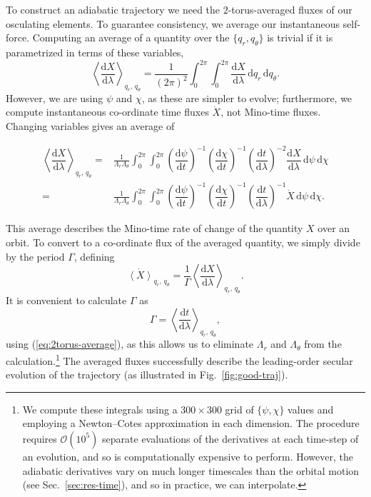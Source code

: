 \documentclass[aps,prd,amsfonts,amssymb,amsmath,nofootinbib,showpacs,superscriptaddress,twocolumn]{revtex4}
\newcommand{\eqnref}[1]{(\ref{eq:#1})}
\newcommand{\figref}[1]{Fig.~\ref{fig:#1}}
\newcommand{\secref}[1]{Sec.~\ref{sec:#1}}
\newcommand{\dd}{\ensuremath{\mathrm{d}}}
\newcommand{\diff}[2]{\ensuremath{\dfrac{\dd {#1}}{\dd {#2}}}}
\newcommand{\intd}[4]{\ensuremath{\int_{#1}^{#2}{#3}\,\dd{#4}}}
\begin{document}
To construct an adiabatic trajectory we need the $2$-torus-averaged fluxes of our osculating elements. To guarantee consistency, we average our instantaneous self-force. Computing an average of a quantity over the $\{q_r, q_\theta\}$ is trivial if it is parametrized in terms of these variables,
\begin{equation}
\left\langle \diff{X}{\lambda}\right\rangle_{q_r,\,q_\theta} = \frac{1}{(2\pi)^2}\intd{0}{2\pi}{\intd{0}{2\pi}{\diff{X}{\lambda}}{q_r}}{q_\theta}.
\end{equation}
However, we are using $\psi$ and $\chi$, as these are simpler to evolve; furthermore, we compute instantaneous co-ordinate time fluxes $\dot{X}$, not Mino-time fluxes. Changing variables gives an average of \cite{Drasco2005}
\begin{widetext}\begin{align}
\left\langle \diff{X}{\lambda}\right\rangle_{q_r,\,q_\theta} = {} & \frac{1}{\Lambda_r \Lambda_\theta}\intd{0}{2\pi}{\intd{0}{2\pi}{\left(\diff{\psi}{t}\right)^{-1} \left(\diff{\chi}{t}\right)^{-1} \left(\diff{t}{\lambda}\right)^{-2} \diff{X}{\lambda}}{\psi}}{\chi} \\
 = {} & \frac{1}{\Lambda_r \Lambda_\theta}\intd{0}{2\pi}{\intd{0}{2\pi}{\left(\diff{\psi}{t}\right)^{-1} \left(\diff{\chi}{t}\right)^{-1} \left(\diff{t}{\lambda}\right)^{-1} \dot{X}}{\psi}}{\chi}.
\label{eq:2torus-average}
\end{align}\end{widetext}
This average describes the Mino-time rate of change of the quantity $X$ over an orbit. To convert to a co-ordinate flux of the averaged quantity, we simply divide by the period $\Gamma$, defining
\begin{equation}
\dot{\left\langle X\right\rangle}_{q_r,\,q_\theta} = \frac{1}{\Gamma}\left\langle \diff{X}{\lambda}\right\rangle_{q_r,\,q_\theta}.
\end{equation}
It is convenient to calculate $\Gamma$ as
\begin{equation}
\Gamma = \left\langle \diff{t}{\lambda}\right\rangle_{q_r,\,q_\theta},
\end{equation}
using \eqnref{2torus-average}, as this allows us to eliminate $\Lambda_r$ and $\Lambda_\theta$ from the calculation.\footnote{We compute these integrals using a $300\times 300$ grid of $\{\psi,\chi\}$ values and employing a Newton--Cotes approximation in each dimension. The procedure requires $\mathcal{O}(10^5)$ separate evaluations of the derivatives at each time-step of an evolution, and so is computationally expensive to perform. However, the adiabatic derivatives vary on much longer timescales than the orbital motion (see \secref{res-time}), and so in practice, we can interpolate.}
The averaged fluxes successfully describe the leading-order secular evolution of the trajectory (as illustrated in \figref{good-traj}).
\end{document}
